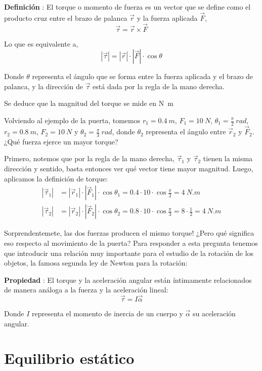 \documentclass[letterpaper]{article}
\newcounter{propiedades}
\newcounter{definiciones}
\newcommand{\propi}{\stepcounter{propiedades} \textbf{Propiedad \thepropiedades}: }
\newcommand{\defii}{\stepcounter{definiciones} \textbf{Definición \thedefiniciones}: }
\newenvironment{prop}
{ \begin{framed} \propi}
{ \end{framed} }
\newenvironment{defi}{\begin{framed} \defii}{\end{framed}}
\begin{document}
\begin{defi}
El torque o momento de fuerza es un vector que se define como el producto cruz entre el brazo de palanca $\vec{r}$ y la fuerza aplicada $\vec{F}$,
$$\vec{\tau} = \vec{r}\times\vec{F}$$

Lo que es equivalente a,
$$|\vec{\tau}| = |\vec{r}|\cdot|\vec{F}|\cdot\cos{\theta}$$

Donde $\theta$ representa el ángulo que se forma entre la fuerza aplicada y el brazo de palanca, y la dirección de $\vec{\tau}$ está dada por la regla de la mano derecha.

Se deduce que la magnitud del torque se mide en \si{N.m}
\end{defi}

Volviendo al ejemplo de la puerta, tomemos $r_1 = 0.4\ \si{m}$, $F_1 = 10\ \si{N}$, $\theta_1 = \frac\pi2\ \si{rad}$, $r_2 = 0.8\ \si{m}$, $F_2 = 10\ \si{N}$ y $\theta_2 = \frac\pi3\ \si{rad}$, donde $\theta_2$ representa el ángulo entre $\vec{r}_2$ y $\vec{F}_2$. ¿Qué fuerza ejerce un mayor torque?

Primero, notemos que por la regla de la mano derecha, $\vec{\tau}_1$ y $\vec{\tau}_2$ tienen la misma dirección y sentido, basta entonces ver qué vector tiene mayor magnitud. Luego, aplicamos la definición de torque:
\begin{align*}
|\vec{\tau}_1| &= |\vec{r}_1|\cdot|\vec{F}_1|\cdot\cos{\theta_1} = 0.4 \cdot 10 \cdot \cos{\frac\pi2} = 4\ \si{N.m} \\
|\vec{\tau}_2| &= |\vec{r}_2|\cdot|\vec{F}_2|\cdot\cos{\theta_2} = 0.8 \cdot 10 \cdot \cos{\frac\pi3} = 8\cdot\frac12 = 4\ \si{N.m}
\end{align*}

Sorprendentemete, las dos fuerzas producen el mismo torque! ¿Pero qué significa eso respecto al movimiento de la puerta? Para responder a esta pregunta tenemos que introducir una relación muy importante para el estudio de la rotación de los objetos, la famosa segunda ley de Newton para la rotación:

\begin{prop}
El torque y la aceleración angular están íntimamente relacionados de manera análoga a la fuerza y la aceleración lineal:
$$\vec{\tau} = I\vec{\alpha}$$

Donde $I$ representa el momento de inercia de un cuerpo y $\vec{\alpha}$ su aceleración angular.
\end{prop}

\section*{Equilibrio estático}
\end{document}
